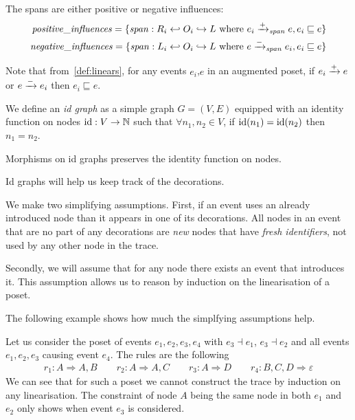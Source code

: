 
The spans are either positive or negative influences:
\begin{align*}
  \mathit{positive\_influences} = \{ \mathit{span}:R_i\hookleftarrow O_i\hookrightarrow L \text{ where } e_i\mathrel{\xrightarrow{+}}_{\mathit{span}} e, e_i\sqsubseteq e\} \\
  \mathit{negative\_influences} = \{ \mathit{span}:L_i\hookleftarrow O_i\hookrightarrow L \text{ where } e\mathrel{\xrightarrow{-}}_{\mathit{span}} e_i, e_i\sqsubseteq e\}
\end{align*}

Note that from~\autoref{def:linears}, for any events $e_i$,$e$ in an augmented poset, if $e_i\mathrel{\xrightarrow{+}} e$ or $e\mathrel{\xrightarrow{-}}e_i$ then $e_i\sqsubseteq e$.

\begin{definition}[Id graphs]
  We define an \emph{id graph} as a simple graph $G = (V,E)$ equipped with an identity function on nodes $\text{id}:V\to \mathbb{N}$ such that $\forall n_1, n_2\in V$, if $\text{id}(n_1)=\text{id}(n_2)$ then $n_1 = n_2$.

  Morphisms on id graphs preserves the identity function on nodes.
\end{definition}

Id graphs will help us keep track of the decorations.

\begin{remark}
\label{rm:simply}
  We make two simplifying assumptions. First, if an event uses an already introduced node than it appears in one of its decorations. All nodes in an event that are no part of any decorations are \emph{new} nodes that have \emph{fresh identifiers}, not used by any other node in the trace.

Secondly, we will assume that for any node there exists an event that introduces it. This assumption allows us to reason by induction on the linearisation of a poset.
\end{remark}

The following example shows how much the simplfying assumptions help.
\begin{example}
 Let us consider the poset of events $e_1,e_2,e_3,e_4$ with $e_3\dashv e_1$, $e_3\dashv e_2$ and all events $e_1,e_2,e_3$ causing event $e_4$. The rules are the following
 \begin{align*}
   r_1:A \Rightarrow A,B\qquad r_2:A \Rightarrow A,C \qquad r_3:A\Rightarrow D\qquad r_4:B,C,D\Rightarrow \varepsilon
 \end{align*}
 We can see that for such a poset we cannot construct the trace by induction on any linearisation. The constraint of node $A$ being the same node in both $e_1$ and $e_2$ only shows when event $e_3$ is considered.
\end{example}

